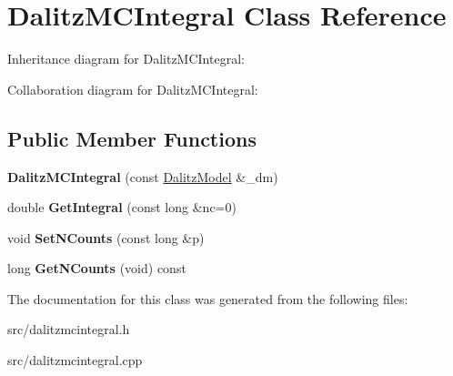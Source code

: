 \hypertarget{class_dalitz_m_c_integral}{}\section{Dalitz\+M\+C\+Integral Class Reference}
\label{class_dalitz_m_c_integral}


Inheritance diagram for Dalitz\+M\+C\+Integral\+:


Collaboration diagram for Dalitz\+M\+C\+Integral\+:
\subsection*{Public Member Functions}
\begin{DoxyCompactItemize}
\item 
\hypertarget{class_dalitz_m_c_integral_a6f4d6ee5af4f35fabca90e36f2271bae}{}{\bfseries Dalitz\+M\+C\+Integral} (const \hyperlink{class_dalitz_model}{Dalitz\+Model} \&\+\_\+dm)\label{class_dalitz_m_c_integral_a6f4d6ee5af4f35fabca90e36f2271bae}

\item 
\hypertarget{class_dalitz_m_c_integral_ac58ebc2f4954cb03ba0a6d9984c37b2f}{}double {\bfseries Get\+Integral} (const long \&nc=0)\label{class_dalitz_m_c_integral_ac58ebc2f4954cb03ba0a6d9984c37b2f}

\item 
\hypertarget{class_dalitz_m_c_integral_ac9a22f8cf6606b9273aef7d8f87a4d5f}{}void {\bfseries Set\+N\+Counts} (const long \&p)\label{class_dalitz_m_c_integral_ac9a22f8cf6606b9273aef7d8f87a4d5f}

\item 
\hypertarget{class_dalitz_m_c_integral_a021f77f85be35724099d27e27ab55ae6}{}long {\bfseries Get\+N\+Counts} (void) const \label{class_dalitz_m_c_integral_a021f77f85be35724099d27e27ab55ae6}

\end{DoxyCompactItemize}


The documentation for this class was generated from the following files\+:\begin{DoxyCompactItemize}
\item 
src/dalitzmcintegral.\+h\item 
src/dalitzmcintegral.\+cpp\end{DoxyCompactItemize}
